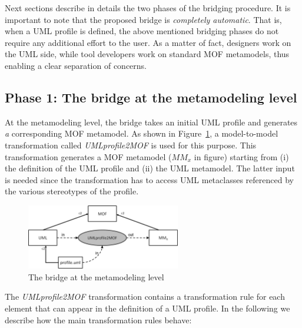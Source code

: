 Next sections describe in details the two phases of the bridging procedure.
It is important to note that the proposed bridge is \textit{completely automatic}. That is, when a UML profile is defined, the above mentioned bridging phases do not require any additional effort to the user. As a matter of fact, designers work on the UML side, while tool developers work on standard MOF metamodels, thus enabling a clear separation of concerns.


\subsection{Phase 1: The bridge at the metamodeling level}\label{sec:metamodelLevel}

At the metamodeling level, the bridge takes an initial UML profile and generates {\em a} corresponding MOF metamodel.
As shown in Figure~\ref{fig:metamodelingLevel}, a model-to-model transformation called
\textit{UMLprofile2MOF} is used for this purpose. This transformation generates a MOF metamodel ($MM_x$ in figure) starting from (i) the definition of the UML profile and (ii) the UML metamodel. The latter input is needed since the transformation has to access UML metaclasses referenced by the various stereotypes of the profile.

\begin{figure}[htbp]
	\centering
		\includegraphics[width=0.60\textwidth]{figures/metamodelingLevel.png}
	\caption{The bridge at the metamodeling level}
	\label{fig:metamodelingLevel}
\end{figure}


%
The \textit{UMLprofile2MOF} transformation contains a transformation rule for each element that can appear in the definition of a UML profile. In the following we describe how the main transformation rules behave:


